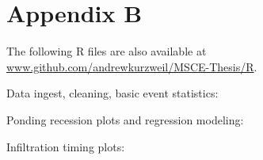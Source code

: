 \chapter{Appendix B}

The following R files are also available at \url{www.github.com/andrewkurzweil/MSCE-Thesis/R}.

Data ingest, cleaning, basic event statistics:


\pagebreak

Ponding recession plots and regression modeling:

\pagebreak

Infiltration timing plots:

